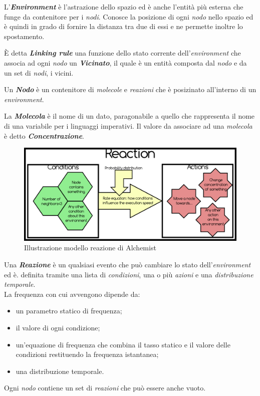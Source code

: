 \documentclass[12pt,a4paper,openright,twoside]{report}
\begin{document}
L'\textbf{\textit{Environment}} \`e l'astrazione dello spazio ed \`e anche l'entit\`a pi\`u esterna che funge da contenitore per i \textit{nodi}. Conosce la posizione di ogni \textit{nodo} nello spazio ed \`e quindi in grado di fornire la distanza tra due di essi e ne permette inoltre lo spostamento.

\`E detta \textbf{\textit{Linking rule}} una funzione dello stato corrente dell'\textit{environment} che associa ad ogni \textit{nodo} un \textbf{\textit{Vicinato}}, il quale \`e un entit\`a composta dal \textit{nodo} e da un set di \textit{nodi}, i vicini.

Un \textbf{\textit{Nodo}} \`e un contenitore di \textit{molecole} e \textit{reazioni} che \`e posizinato all'interno di un \textit{environment}.

La \textbf{\textit{Molecola}} \`e il nome di un dato, paragonabile a quello che rappresenta il nome di una variabile per i linguaggi imperativi.
Il valore da associare ad una \textit{molecola} \`e detto \textbf{\textit{Concentrazione}}.

\begin{figure}[h] %
\begin{center} %
\includegraphics[width=14cm]{images/reaction.png} %
\caption[Illustrazione modello reazione di Alchemist]{Illustrazione modello reazione di Alchemist} \label{fig:alchemistReaction}
\end{center}
\end{figure}

Una \textbf{\textit{Reazione}} \`e un qualsiasi evento che pu\`o cambiare lo stato dell'\textit{environment} ed \`e. definita tramite una lista di \textit{condizioni}, una o pi\`u \textit{azioni} e una \textit{distribuzione temporale}.
\\La frequenza con cui avvengono dipende da:
\begin{itemize}
\item un parametro statico di frequenza;
\item il valore di ogni condizione;
\item un'equazione di frequenza che combina il tasso statico e il valore delle condizioni restituendo la frequenza istantanea;
\item una distribuzione temporale.
\end{itemize}
Ogni \textit{nodo} contiene un set di \textit{reazioni} che pu\`o essere anche vuoto.
\end{document}
